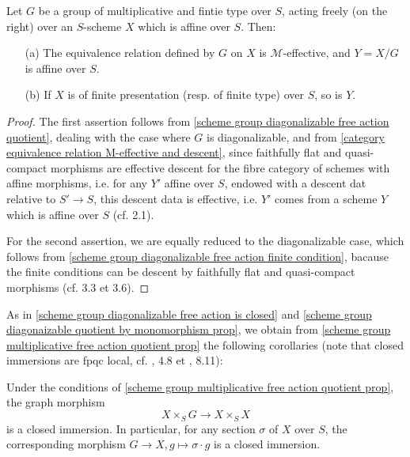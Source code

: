 \begin{proposition}\label{scheme group multiplicative free action quotient prop}
Let $G$ be a group of multiplicative and fintie type over $S$, acting freely (on the right) over an $S$-scheme $X$ which is affine over $S$. Then:
\begin{enumerate}
    \item[(a)] The equivalence relation defined by $G$ on $X$ is $\mathcal{M}$-effective, and $Y=X/G$ is affine over $S$.
    \item[(b)] If $X$ is of finite presentation (resp. of finite type) over $S$, so is $Y$. 
\end{enumerate}
\end{proposition}
\begin{proof}
The first assertion follows from \cref{scheme group diagonalizable free action quotient}, dealing with the case where $G$ is diagonalizable, and from \cref{category equivalence relation M-effective and descent}, since faithfully flat and quasi-compact morphisms are effective descent for the fibre category of schemes with affine morphisms, i.e. for any $Y'$ affine over $S$, endowed with a descent dat relative to $S'\to S$, this descent data is effective, i.e. $Y'$ comes from a scheme $Y$ which is affine over $S$ (cf. \cite{SGA1}  2.1).\par
For the second assertion, we are equally reduced to the diagonalizable case, which follows from \cref{scheme group diagonalizable free action finite condition}, bacause the finite conditions can be descent by faithfully flat and quasi-compact morphisms (cf. \cite{SGA1}  3.3 et 3.6).
\end{proof}

As in \cref{scheme group diagonalizable free action is closed} and \cref{scheme group diagonaizable quotient by monomorphism prop}, we obtain from \cref{scheme group multiplicative free action quotient prop} the following corollaries (note that closed immersions are fpqc local, cf. \cite{EGA1},  4.8 et \cite{EGA4-3}, 8.11):

\begin{corollary}\label{scheme group multiplicative free action graph closed}
Under the conditions of \cref{scheme group multiplicative free action quotient prop}, the graph morphism
\[X\times_SG\to X\times_SX\]
is a closed immersion. In particular, for any section $\sigma$ of $X$ over $S$, the corresponding morphism $G\to X,g\mapsto \sigma\cdot g$ is a closed immersion.
\end{corollary}

